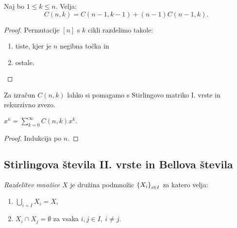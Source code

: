 \begin{trditev}
    Naj bo $1 \leq k \leq n$. Velja:
    $$C(n, k) = C(n-1, k-1) + (n-1)C(n-1, k).$$
\end{trditev}

\begin{proof}
    Permutacije $[n]$ s $k$ cikli razdelimo takole:
    \begin{enumerate}
        \item tiste, kjer je $n$ negibna točka in
        \item ostale. \qedhere
    \end{enumerate}
\end{proof}

Za izračun $C(n,k)$ lahko si pomagamo s Stirlingovo matriko I. vrste in rekurzivno zvezo.

\begin{trditev}
    $x^{\overline{n}} = \sum_{k=0}^{\infty}C(n,k)x^k$.
\end{trditev}

\begin{proof}
    Indukcija po $n$.
\end{proof}

\subsection{Stirlingova števila II. vrste in Bellova števila}
\begin{definicija}
    \emph{Razdelitev množice $X$} je družina podmnožic $\left\{X_i\right\}_{i \in I}$ za katero velja:
    \begin{enumerate}
        \item $\bigcup_{i=I}X_i =X$,
        \item $X_i \cap X_j = \emptyset$ za vsaka $i,j \in I, \ i \neq j$.
    \end{enumerate}
\end{definicija}